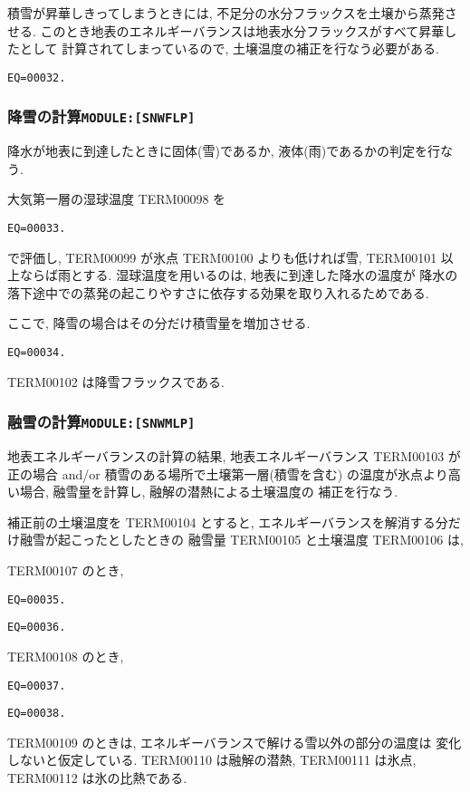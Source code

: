 積雪が昇華しきってしまうときには, 不足分の水分フラックスを土壌から蒸発させる. 
このとき地表のエネルギーバランスは地表水分フラックスがすべて昇華したとして
計算されてしまっているので, 土壌温度の補正を行なう必要がある. 
\begin{verbatim}
EQ=00032.
\end{verbatim}

\subsubsection{降雪の計算\texttt{MODULE:[SNWFLP]}}

降水が地表に到達したときに固体(雪)であるか, 液体(雨)であるかの判定を行なう. 

大気第一層の湿球温度 TERM00098 を
\begin{verbatim}
EQ=00033.
\end{verbatim}
で評価し, TERM00099 が氷点 TERM00100 よりも低ければ雪, TERM00101 以上ならば雨とする. 
湿球温度を用いるのは, 地表に到達した降水の温度が
降水の落下途中での蒸発の起こりやすさに依存する効果を取り入れるためである. 

ここで, 降雪の場合はその分だけ積雪量を増加させる. 
\begin{verbatim}
EQ=00034.
\end{verbatim}
TERM00102 は降雪フラックスである. 

\subsubsection{融雪の計算\texttt{MODULE:[SNWMLP]}}

地表エネルギーバランスの計算の結果, 地表エネルギーバランス TERM00103 が正の場合
 and/or 積雪のある場所で土壌第一層(積雪を含む)
の温度が氷点より高い場合, 融雪量を計算し, 融解の潜熱による土壌温度の
補正を行なう. 

補正前の土壌温度を TERM00104 とすると, 
エネルギーバランスを解消する分だけ融雪が起こったとしたときの
融雪量 TERM00105 と土壌温度 TERM00106 は, 

TERM00107 のとき, 
\begin{verbatim}
EQ=00035.
\end{verbatim}
\begin{verbatim}
EQ=00036.
\end{verbatim}
TERM00108 のとき, 
\begin{verbatim}
EQ=00037.
\end{verbatim}
\begin{verbatim}
EQ=00038.
\end{verbatim}
TERM00109 のときは, エネルギーバランスで解ける雪以外の部分の温度は
変化しないと仮定している. 
TERM00110 は融解の潜熱, TERM00111 は氷点, TERM00112 は氷の比熱である. 

